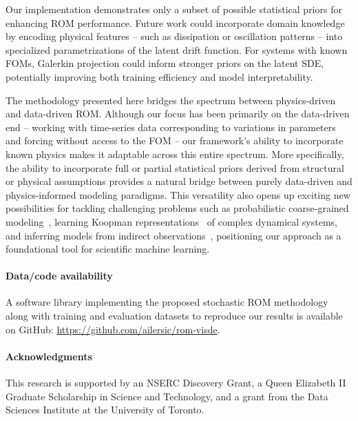 \documentclass{article}
\begin{document}
	Our implementation demonstrates only a subset of possible statistical priors for enhancing ROM performance. Future work could incorporate domain knowledge by encoding physical features -- such as dissipation or oscillation patterns -- into specialized parametrizations of the latent drift function. For systems with known FOMs, Galerkin projection could inform stronger priors on the latent SDE, potentially improving both training efficiency and model interpretability.
	
	
	The methodology presented here bridges the spectrum between physics-driven and data-driven ROM. Although our focus has been primarily on the data-driven end -- working with time-series data corresponding to variations in parameters and forcing without access to the FOM -- our framework's ability to incorporate known physics makes it adaptable across this entire spectrum. More specifically, the ability to incorporate full or partial statistical priors derived from structural or physical assumptions provides a natural bridge between purely data-driven and physics-informed modeling paradigms. This versatility also opens up exciting new possibilities for tackling challenging problems such as probabilistic coarse-grained modeling~\cite{Wang_2019_CG_MD}, learning Koopman representations~\cite{Brunton_2022_Koopman} of complex dynamical systems, and inferring models from indirect observations~\cite{Course_2023_State_Estimation, Raissi_2020_Learning_Fluids}, positioning our approach as a foundational tool for scientific machine learning.
	
	\paragraph{Data/code availability}
	A software library implementing the proposed stochastic ROM methodology along with training and evaluation datasets to reproduce our results is available on GitHub: \url{https://github.com/ailersic/rom-visde}.
	
	\paragraph{Acknowledgments}
	This research is supported by an NSERC Discovery Grant, a Queen Elizabeth II Graduate Scholarship in Science and Technology, and a grant from the Data Sciences Institute at the University of Toronto.
	
	
	
	
	\newpage
	\appendix
		
\end{document}
